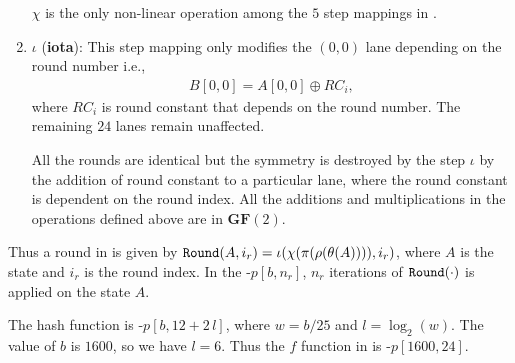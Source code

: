 \begin{enumerate}
    $\chi$ is the only non-linear operation among the $5$ step mappings in \KECCAK{}.
    
    \vskip5pt
    \item $\iota$ ({\bf iota}): This step mapping only modifies the $(0, 0)$ lane depending on the round number i.e., 
    \begin{align}
       B[0, 0] = A[0, 0] \oplus RC_i,
   \end{align}
    where $RC_i$ is round constant that depends on the round number. The remaining $24$ lanes remain unaffected.
    
    All the rounds are identical but the symmetry is destroyed by the step $\iota$ by the addition of round constant to a particular lane, where the round constant is dependent on the round index.
    All the additions and multiplications in the operations defined above are in $\textbf{GF}(2)$.
\end{enumerate}
Thus a round in \Keccak{} is given by ${\tt Round}(A, i_r) = \iota( \chi( \pi ( \rho ( \theta ( A ) ) ) ) , i_r)$, where $A$ is the state and $i_r$ is the round index. In the \Keccak-$p[b, n_r]$, $n_r$ iterations of ${\tt Round}(\cdot)$ is applied on the state $A$.

The  hash function is \Keccak-$p[b, 12 + 2\,l]$, where $w = b/25$ and $l = \log_{2}(w)$. The value of $b$ is $1600$, so we have $l = 6$. Thus the $f$ function in  is \Keccak-$p[1600, 24]$.

